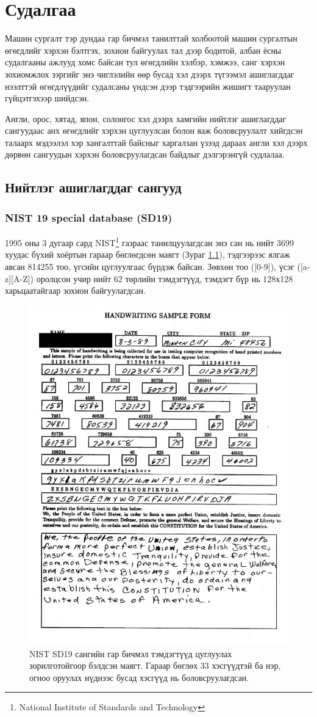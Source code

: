 \chapter{Судалгаа}

Машин сургалт тэр дундаа гар бичмэл танилттай холбоотой машин сургалтын өгөгдлийг хэрхэн бэлтгэх, зохион байгуулах тал дээр бодитой, албан ёсны судалгааны ажлууд хомс байсан тул өгөгдлийн хэлбэр, хэмжээ, санг хэрхэн зохиомжлох зэргийг энэ чиглэлийн өөр бусад хэл дээрх түгээмэл ашиглагддаг нээлттэй өгөгдлүүдийг судалсаны үндсэн дээр тэдгээрийн жишигт тааруулан гүйцэтгэхээр шийдсэн.

Англи, орос, хятад, япон, солонгос хэл дээрх хамгийн нийтлэг ашиглагддаг сангуудаас анх өгөгдлийг хэрхэн цуглуулсан болон яаж боловсруулалт хийгдсэн талаарх мэдээлэл хэр хангалттай байсныг харгалзан үзээд дараах англи хэл дээрх дөрвөн сангуудын хэрхэн боловсруулагдсан байдлыг дэлгэрэнгүй судлалаа.

\section{Нийтлэг ашиглагддаг сангууд}

\subsection{NIST 19 special database (SD19)}

1995 оны 3 дугаар сард NIST\footnote{National Institute of Standards and Technology} газраас танилцуулагдсан энэ сан нь нийт 3699 хуудас бүхий хоёртын гараар бөглөгдсөн маягт (Зураг \ref{fig:sd19}), тэдгээрээс ялгаж авсан 814255 тоо, үгсийн цуглуулгаас бүрдэж байсан. Зөвхөн тоо ([0-9]), үсэг ([a-z][A-Z]) оролцсон учир нийт 62 төрлийн тэмдэгтүүд, тэмдэгт бүр нь 128х128 харьцаатайгаар зохион байгуулагдсан. \cite{nist19}

\begin{figure}[ht]
	\centering
	\includegraphics[width=0.6\linewidth]{images/sd19}
	\caption{NIST SD19 сангийн гар бичмэл тэмдэгтүүд цуглуулах зорилготойгоор бэлдсэн маягт. Гараар бөглөх 33 хэсгүүдтэй ба нэр, огноо оруулах нүднээс бусад хэсгүүд нь боловсруулагдсан.}
	\label{fig:sd19}
\end{figure}

